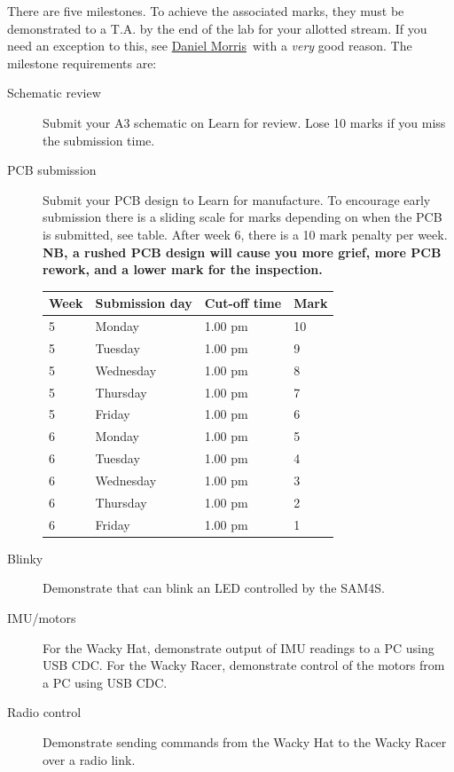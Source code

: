 \documentclass[11pt, a4paper]{article}
\makeatletter
\newcommand{\daniel}{\href{mailto:daniel.morris@pg.canterbury.ac.nz}{Daniel Morris}}
\makeatother
\begin{document}
There are five milestones.  To achieve the associated marks, they must
be demonstrated to a T.A. by the end of the lab for your allotted
stream.  If you need an exception to this, see \daniel\ with a
\emph{very} good reason.  The milestone requirements are:
%
\begin{description}
\item [Schematic review] Submit your A3 schematic on Learn for
  review.  Lose 10 marks if you miss the submission time.

\item [PCB submission] Submit your PCB design to Learn for
  manufacture.  To encourage early submission there is a sliding scale
  for marks depending on when the PCB is submitted, see table.  After
  week 6, there is a 10 mark penalty per week.  \textbf{NB, a rushed
    PCB design will cause you more grief, more PCB rework, and a lower
    mark for the inspection.}

  \begin{tabular}{llll}
    Week & Submission day & Cut-off time  & Mark \\ \hline
    5    & Monday       & 1.00 pm & 10 \\
    5    & Tuesday      & 1.00 pm & 9 \\
    5    & Wednesday    & 1.00 pm & 8 \\
    5    & Thursday     & 1.00 pm & 7 \\
    5    & Friday       & 1.00 pm & 6 \\
    6    & Monday       & 1.00 pm & 5 \\
    6    & Tuesday      & 1.00 pm & 4 \\
    6    & Wednesday    & 1.00 pm & 3 \\
    6    & Thursday     & 1.00 pm & 2 \\
    6    & Friday       & 1.00 pm & 1  \\
  \end{tabular}

\item [Blinky] Demonstrate that can blink an LED controlled by the SAM4S.

\item [IMU/motors] For the Wacky Hat, demonstrate output of IMU
  readings to a PC using USB CDC.  For the Wacky Racer, demonstrate
  control of the motors from a PC using USB CDC.

\item[Radio control] Demonstrate sending commands from the Wacky Hat
  to the Wacky Racer over a radio link.
\end{description}
\end{document}
